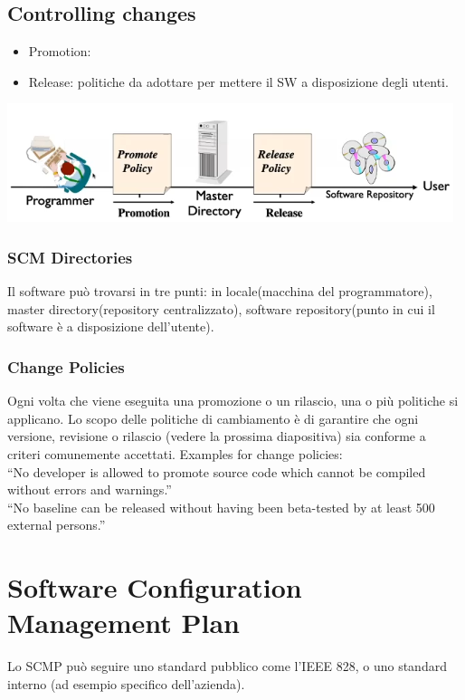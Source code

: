 \documentclass[10pt,a4paper]{book}
\begin{document}
\subsection{Controlling changes}
\begin{itemize}
\item Promotion: 
\item Release: politiche da adottare per mettere il SW a disposizione degli utenti.\\
\end{itemize}
\includegraphics[scale=0.7]{changes.png} 

\subsubsection{SCM Directories}
Il software può trovarsi in tre punti: in locale(macchina del programmatore), master directory(repository centralizzato), software repository(punto in cui il software è a disposizione dell'utente).

\subsubsection{Change Policies}
Ogni volta che viene eseguita una promozione o un rilascio, una o più politiche si applicano. Lo scopo delle politiche di cambiamento è di garantire che ogni versione, revisione o rilascio (vedere la prossima diapositiva) sia conforme a criteri comunemente accettati.
Examples for change policies:\\
“No developer is allowed to promote source code which cannot be compiled without errors and warnings.”\\

“No baseline can be released without having been beta-tested by at least 500 external persons.”\\

\section{Software Configuration Management Plan}
Lo SCMP può seguire uno standard pubblico come l'IEEE 828, o uno standard interno (ad esempio specifico dell'azienda).
\end{document}
